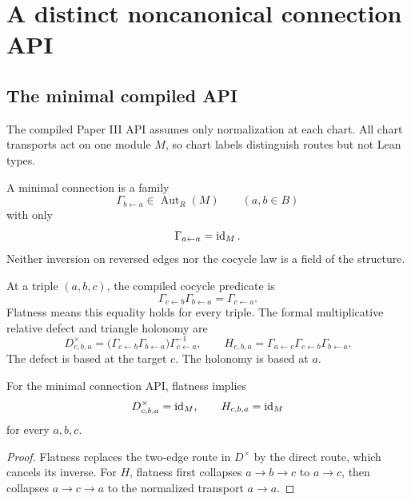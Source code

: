 \section{A distinct noncanonical connection API}
\label{sec:connection}

\subsection{The minimal compiled API}

The compiled Paper III API assumes only normalization at each chart.  All
chart transports act on one module $M$, so chart labels distinguish routes
but not Lean types.

\begin{definition}
\label{def:minimal-connection}
A minimal connection is a family
\[
\Gamma_{b\leftarrow a}\in\operatorname{Aut}_R(M)
\qquad(a,b\in B)
\]
with only
\[
\Gamma_{a\leftarrow a}=\operatorname{id}_M.
\]
Neither inversion on reversed edges nor the cocycle law is a field of the
structure.
\end{definition}

At a triple $(a,b,c)$, the compiled cocycle predicate is
\[
\Gamma_{c\leftarrow b}\Gamma_{b\leftarrow a}
=\Gamma_{c\leftarrow a}.
\]
Flatness means this equality holds for every triple.  The formal
multiplicative relative defect and triangle holonomy are
\[
D^\times_{c,b,a}
=
\bigl(\Gamma_{c\leftarrow b}\Gamma_{b\leftarrow a}\bigr)
\Gamma_{c\leftarrow a}^{-1},
\qquad
H_{c,b,a}
=
\Gamma_{a\leftarrow c}
\Gamma_{c\leftarrow b}
\Gamma_{b\leftarrow a}.
\]
The defect is based at the target $c$.  The holonomy is based at $a$.

\begin{theorem}
\label{thm:minimal-flatness}
For the minimal connection API, flatness implies
\[
D^\times_{c,b,a}=\operatorname{id}_M,
\qquad
H_{c,b,a}=\operatorname{id}_M
\]
for every $a,b,c$.
\end{theorem}

\begin{proof}
Flatness replaces the two-edge route in $D^\times$ by the direct route,
which cancels its inverse.  For $H$, flatness first collapses $a\to b\to c$
to $a\to c$, then collapses $a\to c\to a$ to the normalized transport
$a\to a$.
\end{proof}


